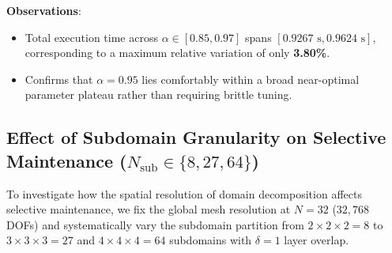 \documentclass[preprint,12pt,3p]{elsarticle}
\begin{document}
\textbf{Observations}:
\begin{itemize}
    \item Total execution time across $\alpha \in [0.85, 0.97]$ spans $[0.9267\text{ s}, 0.9624\text{ s}]$, corresponding to a maximum relative variation of only \textbf{3.80\%}.
    \item Confirms that $\alpha = 0.95$ lies comfortably within a broad near-optimal parameter plateau rather than requiring brittle tuning.
\end{itemize}

\subsection{Effect of Subdomain Granularity on Selective Maintenance ($N_{\text{sub}} \in \{8, 27, 64\}$)}
\label{subsec:res_granularity}
To investigate how the spatial resolution of domain decomposition affects selective maintenance, we fix the global mesh resolution at $N=32$ ($32,768$ DOFs) and systematically vary the subdomain partition from $2 \times 2 \times 2 = 8$ to $3 \times 3 \times 3 = 27$ and $4 \times 4 \times 4 = 64$ subdomains with $\delta = 1$ layer overlap.

\begin{table}[htbp]
\centering
\small
\caption{Effect of subdomain granularity across $N_{\text{sub}} \in \{8, 27, 64\}$ ($N=32$, 3 time steps).}
\label{tab:subdomain_granularity}
\end{table}
\end{document}
